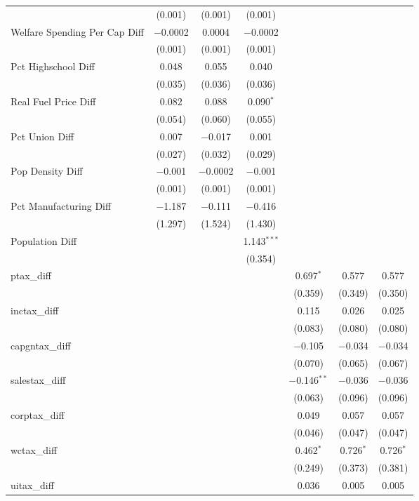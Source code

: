 \begin{table}[!htbp]
\begin{tabular}{@{\extracolsep{5pt}}lcccccc}
  & (0.001) & (0.001) & (0.001) &  &  &  \\ 
  Welfare Spending Per Cap Diff & $-$0.0002 & 0.0004 & $-$0.0002 &  &  &  \\ 
  & (0.001) & (0.001) & (0.001) &  &  &  \\ 
  Pct Highschool Diff & 0.048 & 0.055 & 0.040 &  &  &  \\ 
  & (0.035) & (0.036) & (0.036) &  &  &  \\ 
  Real Fuel Price Diff & 0.082 & 0.088 & 0.090$^{*}$ &  &  &  \\ 
  & (0.054) & (0.060) & (0.055) &  &  &  \\ 
  Pct Union Diff & 0.007 & $-$0.017 & 0.001 &  &  &  \\ 
  & (0.027) & (0.032) & (0.029) &  &  &  \\ 
  Pop Density Diff & $-$0.001 & $-$0.0002 & $-$0.001 &  &  &  \\ 
  & (0.001) & (0.001) & (0.001) &  &  &  \\ 
  Pct Manufacturing Diff & $-$1.187 & $-$0.111 & $-$0.416 &  &  &  \\ 
  & (1.297) & (1.524) & (1.430) &  &  &  \\ 
  Population Diff &  &  & 1.143$^{***}$ &  &  &  \\ 
  &  &  & (0.354) &  &  &  \\ 
  ptax\_diff &  &  &  & 0.697$^{*}$ & 0.577 & 0.577 \\ 
  &  &  &  & (0.359) & (0.349) & (0.350) \\ 
  inctax\_diff &  &  &  & 0.115 & 0.026 & 0.025 \\ 
  &  &  &  & (0.083) & (0.080) & (0.080) \\ 
  capgntax\_diff &  &  &  & $-$0.105 & $-$0.034 & $-$0.034 \\ 
  &  &  &  & (0.070) & (0.065) & (0.067) \\ 
  salestax\_diff &  &  &  & $-$0.146$^{**}$ & $-$0.036 & $-$0.036 \\ 
  &  &  &  & (0.063) & (0.096) & (0.096) \\ 
  corptax\_diff &  &  &  & 0.049 & 0.057 & 0.057 \\ 
  &  &  &  & (0.046) & (0.047) & (0.047) \\ 
  wctax\_diff &  &  &  & 0.462$^{*}$ & 0.726$^{*}$ & 0.726$^{*}$ \\ 
  &  &  &  & (0.249) & (0.373) & (0.381) \\ 
  uitax\_diff &  &  &  & 0.036 & 0.005 & 0.005 \\ 

\end{tabular}
\end{table}

